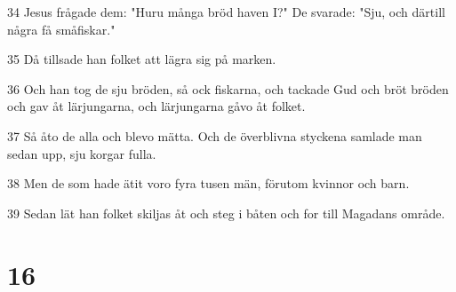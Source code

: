 \par 34 Jesus frågade dem: "Huru många bröd haven I?" De svarade: "Sju, och därtill några få småfiskar."
\par 35 Då tillsade han folket att lägra sig på marken.
\par 36 Och han tog de sju bröden, så ock fiskarna, och tackade Gud och bröt bröden och gav åt lärjungarna, och lärjungarna gåvo åt folket.
\par 37 Så åto de alla och blevo mätta. Och de överblivna styckena samlade man sedan upp, sju korgar fulla.
\par 38 Men de som hade ätit voro fyra tusen män, förutom kvinnor och barn.
\par 39 Sedan lät han folket skiljas åt och steg i båten och for till Magadans område.

\chapter{16}


